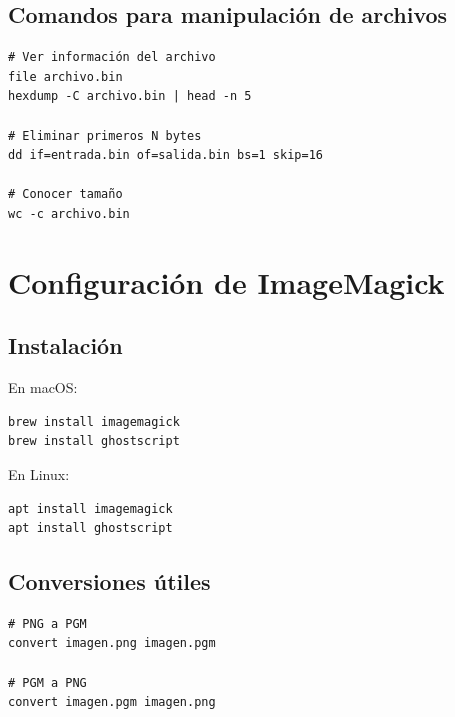 \documentclass[12pt,a4paper]{report}
\begin{document}
\section{Comandos para manipulación de archivos}

\begin{lstlisting}[caption=Comandos útiles]
# Ver información del archivo
file archivo.bin
hexdump -C archivo.bin | head -n 5

# Eliminar primeros N bytes
dd if=entrada.bin of=salida.bin bs=1 skip=16

# Conocer tamaño
wc -c archivo.bin
\end{lstlisting}

\chapter{Configuración de ImageMagick}

\section{Instalación}

En macOS:
\begin{lstlisting}
brew install imagemagick
brew install ghostscript
\end{lstlisting}

En Linux:
\begin{lstlisting}
apt install imagemagick
apt install ghostscript
\end{lstlisting}

\section{Conversiones útiles}

\begin{lstlisting}[caption=Conversiones de imagen]
# PNG a PGM
convert imagen.png imagen.pgm

# PGM a PNG
convert imagen.pgm imagen.png

\end{lstlisting}
\end{document}
